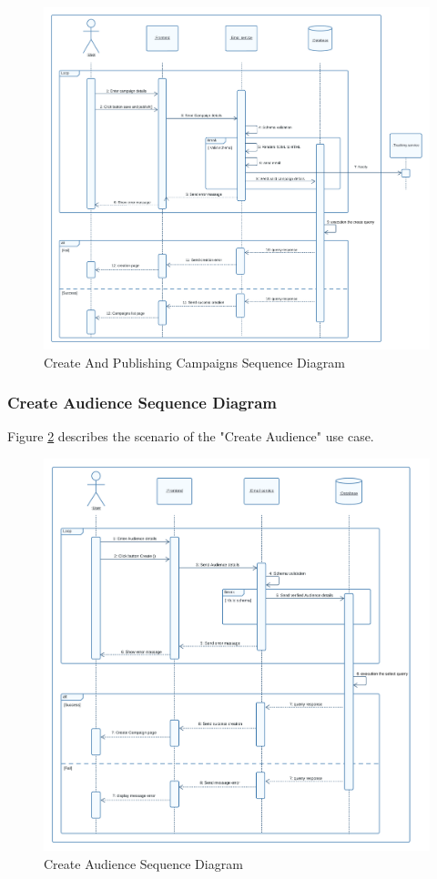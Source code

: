 \begin{figure}[ht]
	\centering
	\includegraphics[width=\linewidth]{Images/Sprint1/sequence diagram sprint 1/campaign_creation.png}
	\caption{ Create And Publishing Campaigns Sequence Diagram}
	\label{fig:Sprint 1 Create And Publishing Campaigns Sequence Diagram}
\end{figure}

\clearpage

\subsubsection{Create Audience Sequence Diagram}

Figure \ref{fig:Sprint 1 Create Audience Sequence Diagram} describes the scenario of the "Create Audience" use case.

\begin{figure}[ht]
	\centering
	\includegraphics[width=\linewidth]{Images/Sprint1/sequence diagram sprint 1/create audience.png}
	\caption{ Create Audience Sequence Diagram }
	\label{fig:Sprint 1 Create Audience Sequence Diagram}
\end{figure}

\clearpage

